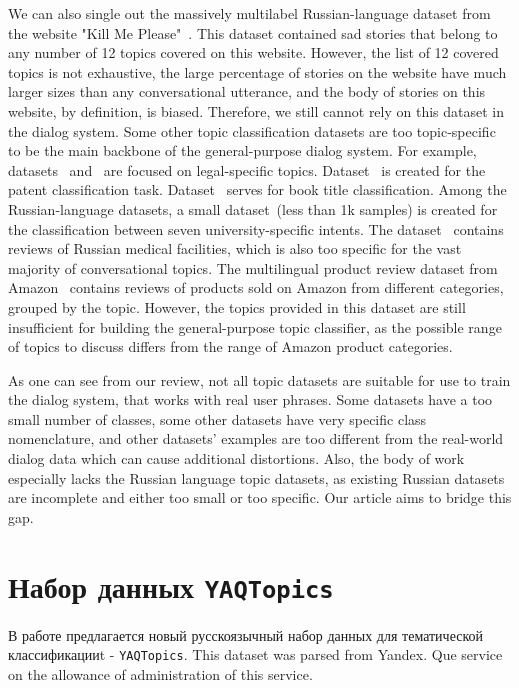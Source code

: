 We can also single out the massively multilabel Russian-language dataset from the website "Kill Me Please"~\cite{kill_me_please}. This dataset contained sad stories that belong to any number of 12 topics covered on this website. However, the list of 12 covered topics is not exhaustive, the large percentage of stories on the website have much larger sizes than any conversational utterance, and the body of stories on this website, by definition, is biased. Therefore, we still cannot rely on this dataset in the dialog system.
Some other topic classification datasets are too topic-specific to be the main backbone of the general-purpose dialog system. For example, datasets~\cite{lexglue} and~\cite{lextreme} are focused on legal-specific topics. Dataset~\cite{hupd} is created for the patent classification task. Dataset~\cite{blbooksgenre} serves for book title classification.
 Among the Russian-language datasets, a small dataset~\cite{pstu}(less than 1k samples) is created for the classification between seven university-specific intents. The dataset~\cite{healthcare_facilities_reviews} contains reviews of Russian medical facilities, which is also too specific for the vast majority of conversational topics. 
The multilingual product review dataset from Amazon~\cite{amazon_reviews} contains reviews of products sold on Amazon from different categories, grouped by the topic. However, the topics provided in this dataset are still insufficient for building the general-purpose topic classifier, as the possible range of topics to discuss differs from the range of Amazon product categories. 

As one can see from our review, not all topic datasets are suitable for use to train the dialog system, that works with real user phrases. Some datasets have a too small number of classes, some other datasets have very specific class nomenclature, and other datasets' examples are too different from the real-world dialog data which can cause additional distortions. Also, the body of work especially lacks the Russian language topic datasets, as existing Russian datasets are incomplete and either too small or too specific. Our article aims to bridge this gap. 


\section{Набор данных \texttt{YAQTopics}} 

В работе предлагается новый русскоязычный набор данных для тематической классификацииt - \texttt{YAQTopics}. This dataset was parsed from Yandex. Que service~\cite{yandex_q} on the allowance of administration of this service\iffalse\footnote{After submitting the article, we have found the dataset \url{https://huggingface.co/datasets/its5Q/yandex-q}, which also contains the questions and answers from "Yandex.Que". However, this dataset does not contain topics.}\fi.

